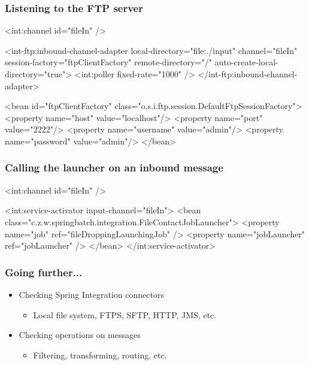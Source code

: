 \begin{frame}[fragile]
 \frametitle{Listening to the FTP server}
 \begin{xmlcode}
<int:channel id="fileIn" />

<int-ftp:inbound-channel-adapter local-directory="file:./input" 
    channel="fileIn" session-factory="ftpClientFactory" 
    remote-directory="/" auto-create-local-directory="true">
  <int:poller fixed-rate="1000" />
</int-ftp:inbound-channel-adapter>

<bean id="ftpClientFactory"
      class="o.s.i.ftp.session.DefaultFtpSessionFactory">
  <property name="host" value="localhost"/>
  <property name="port" value="2222"/>
  <property name="username" value="admin"/>
  <property name="password" value="admin"/>
</bean>
 \end{xmlcode}
\end{frame}

\begin{frame}[fragile]
\frametitle{Calling the launcher on an inbound message}
\begin{xmlcode}
<int:channel id="fileIn" />

<int:service-activator input-channel="fileIn">
  <bean 
    class="c.z.w.springbatch.integration.FileContactJobLauncher">
    <property name="job" ref="fileDroppingLaunchingJob" />
    <property name="jobLauncher" ref="jobLauncher" />
  </bean>
</int:service-activator>
 \end{xmlcode}
\end{frame}

\begin{frame}
 \frametitle{Going further...}
 \begin{itemize}
  \item Checking Spring Integration connectors
  \begin{itemize}
   \item Local file system, FTPS, SFTP, HTTP, JMS, etc.
  \end{itemize}
  \item Checking operations on messages
  \begin{itemize}
   \item Filtering, transforming, routing, etc.
  \end{itemize}
 \end{itemize}
\end{frame}

